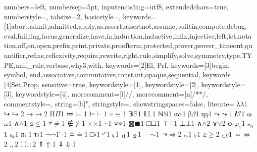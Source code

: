 {
  numbers=left,
  numbersep=5pt,
  inputencoding=utf8,
  extendedchars=true,
  numberstyle=\footnotesize,
  tabsize=2,
  basicstyle={\ttfamily\scriptsize\upshape},
  keywords=[1]{abort,admit,admitted,apply,as,assert,assertnot,assume,builtin,compute,debug, eval,fail,flag,focus,generalize,have,in,induction,inductive,infix,injective,left,let,notation,off,on,open,prefix,print,private,proofterm,protected,prover,prover_timeout,quantifier,refine,reflexivity,require,rewrite,right,rule,simplify,solve,symmetry,type,TYPE,unif_rule,verbose,why3,with},
  keywords=[2]{El, Prf},
  keywords=[3]{begin, symbol, end,associative,commutative,constant,opaque,sequential},
  keywords=[4]{Set,Prop},
  sensitive=true,
  keywordstyle={[1]\bfseries\color{purple}},
  keywordstyle={[2]\bfseries\color{purple}},
  keywordstyle={[3]\bfseries\color{violet}},
  keywordstyle={[4]\bfseries\color{blue}},
  morecomment=[l]{//},
  morecomment=[n]{/*}{*/},
  commentstyle={\itshape\color{teal}},
  string=[b]{"},
  stringstyle=\color{orange},
  showstringspaces=false,
  literate=
  {λ}{$\lambda$}1
  {↪}{$\hookrightarrow$}2
  {→}{$\rightarrow$}2
  {Π}{$\Pi$}1
  {≔}{$\coloneqq$}1
  {⊢}{$\vdash$}1
  {≡}{$\equiv$}1
  {𝔹}{$\mathbb{B}$}1
  {𝕃}{$\mathbb{L}$}1
  {ℕ}{$\mathbb{N}$}1
  {α}{$\alpha$}1
  {β}{$\beta$}1
  {η}{$\eta$}1
  {⤳}{$\rightcurvedarrow$}1
  {𝑰}{$\mathcal{I}$}1
  {ω}{$\omega$}1
  {∧}{$\wedge$}1
  {≤}{$\le$}1
  {≠}{$\neq$}1
  {∉}{$\notin$}1
  {×}{$\times$}1
  {⋅}{$\cdot$}1
  {⟇}{$\veedot$}1
  {▩}{$\blacksquare$}1
  {□}{$\Square$}1
  {⊤}{$\top$}1
  {⊥}{$\bot$}1
  {∧}{$\land$}2
  {∨}{$\lor$}2
  {φ₁}{$\varphi_1$}1
  {ₙ}{$_n$}1
  {ₖ}{$_k$}1
  {π}{$\pi$}1
  {τ}{$\tau$}1
  {¬}{$\neg$}1
  { ̇}{$\cdot$}1
  {≐}{$\doteq$}1
  {□}{$\square$}1
  {ᶜ}{${^c}$}1
  {ᵢ}{$_{\!i}$}1
  {₁}{$_{\!1}$}1
  {₂}{$_{\!2}$}1
  {—}{$\sim$}1
  {⇒}{$\Rightarrow$}2
  {ₑ}{${_e}$}1
  {ₗ}{${_l}$}1
  {≥}{$\geq$}2
  {ᵣ}{$\_r$}1
  {⇔}{$\Leftrightarrow$}2
  {‚}{$,$}2
  {⸬}{$\colon\colon$}2
  {⇑}{$\Uparrow$}1
  {⇓}{$\Downarrow$}1
}


\newcommand\smtinline[1]{\lstinline[language=SMT,basicstyle=\ttfamily\normalsize]|#1|}
\newcommand\rareinline[1]{\lstinline[language=RARE,basicstyle=\ttfamily\normalsize]|#1|}
\newcommand\lpinline[1]{\lstinline[language=Lambdapi,basicstyle=\ttfamily\normalsize]|#1|}